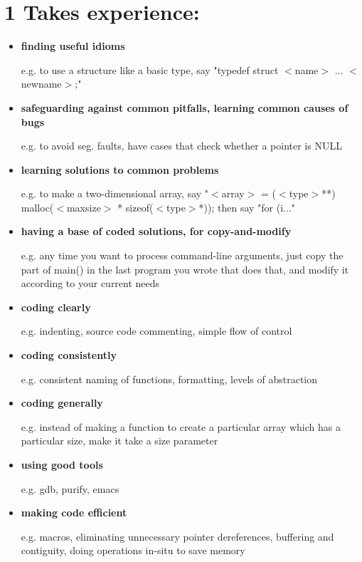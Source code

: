 \section*{1  Takes experience:}
\begin{itemize}
\item {\bf finding useful idioms}

		e.g. to use a structure like a basic type, say "typedef struct $<$name$>$
			{ ... } $<$newname$>$;"

\item {\bf safeguarding against common pitfalls, learning common causes of bugs}

		e.g. to avoid seg. faults, have cases that check whether a pointer is
			NULL

\item {\bf learning solutions to common problems}

		e.g. to make a two-dimensional array, say "$<$array$>$ = ($<$type$>$**) 
			malloc($<$maxsize$>$ * sizeof($<$type$>$*)); then say "for (i..."

\item {\bf having a base of coded solutions, for copy-and-modify}

		e.g. any time you want to process command-line arguments, just copy
			the part of main() in the last program you wrote that does that,
			and modify it according to your current needs

\item {\bf coding clearly}

		e.g. indenting, source code commenting, simple flow of control

\item {\bf coding consistently}

		e.g. consistent naming of functions, formatting, levels of abstraction

\item {\bf coding generally}

		e.g. instead of making a function to create a particular array which
			has a particular size, make it take a size parameter

\item {\bf using good tools}

		e.g. gdb, purify, emacs

\item {\bf making code efficient}

		e.g. macros, eliminating unnecessary pointer dereferences, buffering
			and contiguity, doing operations in-situ to save memory


\end{itemize}
